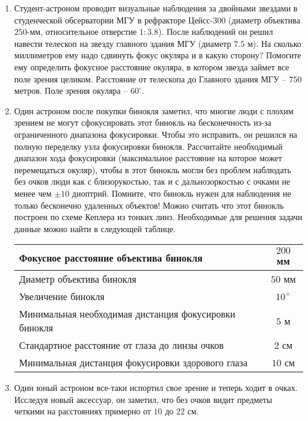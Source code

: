 \documentclass[12pt]{article}
\begin{document}
\begin{enumerate}
    \item Студент-астроном проводит визуальные наблюдения за двойными звездами в студенческой обсерватории МГУ в рефракторе Цейсс-300 (диаметр объектива $250$-мм, относительное отверстие $1:3.8$). После наблюдений он решил навести телескоп на звезду главного здания МГУ (диаметр $7.5$ м). На сколько миллиметров ему надо сдвинуть фокус окуляра и в какую сторону? Помогите ему определить фокусное расстояние окуляра, в котором звезда займет все поле зрения целиком. Расстояние от телескопа до Главного здания МГУ -- $750$ метров. Поле зрения окуляра -- $60^{\circ}$.
    \item Один астроном после покупки бинокля заметил, что многие люди с плохим зрением не могут сфокусировать этот бинокль на бесконечность из-за ограниченного диапазона фокусировки. Чтобы это исправить, он решился на полную переделку узла фокусировки бинокля. Рассчитайте необходимый диапазон хода фокусировки (максимальное расстояние на которое может перемещаться окуляр), чтобы в этот бинокль могли без проблем наблюдать без очков люди как с близорукостью, так и с дальнозоркостью с очками не менее чем $\pm10$ диоптрий. Помните, что бинокль нужен для наблюдения не только бесконечно удаленных объектов! Можно считать что этот бинокль построен по схеме Кеплера из тонких линз. Необходимые для решения задачи данные можно найти в следующей таблице.
    \begin{table}[h]
        \centering
        \begin{tabular}{|l|c|}\hline
            Фокусное расстояние объектива бинокля & $200$ мм \\ \hline
            Диаметр объектива бинокля & $50$ мм \\ \hline
            Увеличение бинокля & $10^{\times}$ \\ \hline
            Минимальная необходимая дистанция фокусировки бинокля & $5$ м \\ \hline 
            Стандартное расстояние от глаза до линзы очков & $2$ см \\ \hline
            Минимальная дистанция фокусировки здорового глаза & $10$ см \\ \hline
        \end{tabular}
    \end{table}
    \item Один юный астроном все-таки испортил свое зрение и теперь ходит в очках. Исследуя новый аксессуар, он заметил, что без очков видит предметы четкими на расстояниях примерно от $10$ до $22$ см.
    \begin{enumerate}

\end{enumerate}
\end{enumerate}
\end{document}
